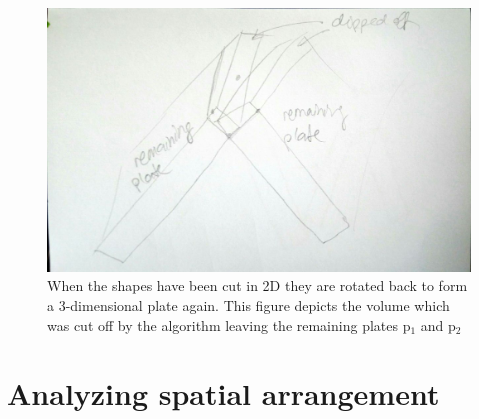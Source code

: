 \documentclass[../ClassicThesis.tex]{subfiles}
\begin{document}
\begin{figure}[!ht]
\centering
\includegraphics[width=.5\columnwidth, angle = 90]{Images/06-1-graph-clippingResult.jpg}
\caption{When the shapes have been cut in 2D they are rotated back to form a 3-dimensional plate again. This figure depicts the volume which was cut off by the algorithm leaving the remaining plates p$_1$ and p$_2$}
\end{figure}


\section{Analyzing spatial arrangement}
\end{document}
